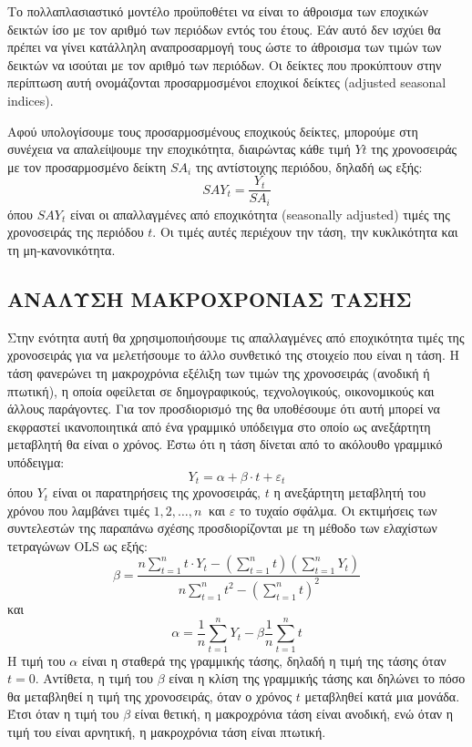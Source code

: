 Το πολλαπλασιαστικό μοντέλο προϋποθέτει να είναι το άθροισμα των εποχικών
δεικτών ίσο με τον αριθμό των περιόδων εντός του έτους. Εάν αυτό δεν ισχύει θα
πρέπει να γίνει κατάλληλη αναπροσαρμογή τους ώστε το άθροισμα των τιμών των
δεικτών να ισούται με τον αριθμό των περιόδων. Οι δείκτες που προκύπτουν στην
περίπτωση αυτή ονομάζονται προσαρμοσμένοι εποχικοί δείκτες (adjusted seasonal
indices).

Αφού υπολογίσουμε τους προσαρμοσμένους εποχικούς δείκτες, μπορούμε στη
συνέχεια να απαλείψουμε την εποχικότητα, διαιρώντας κάθε τιμή $Y t$ της χρονοσειράς
με τον προσαρμοσμένο δείκτη $SA_i$ της αντίστοιχης περιόδου, δηλαδή ως εξής:\\
$$ SAY_t=\frac{Y_t}{SA_i} $$
όπου $SAY_t$ είναι οι απαλλαγμένες από εποχικότητα (seasonally adjusted) τιμές της
χρονοσειράς της περιόδου $t$. Οι τιμές αυτές περιέχουν την τάση, την κυκλικότητα και
τη μη-κανονικότητα.
\subsection{ΑΝΑΛΥΣΗ ΜΑΚΡΟΧΡΟΝΙΑΣ ΤΑΣΗΣ}
Στην ενότητα αυτή θα χρησιμοποιήσουμε τις απαλλαγμένες από εποχικότητα
τιμές της χρονοσειράς για να μελετήσουμε το άλλο συνθετικό της στοιχείο που είναι
η τάση. Η τάση φανερώνει τη μακροχρόνια εξέλιξη των τιμών της χρονοσειράς
(ανοδική ή πτωτική), η οποία οφείλεται σε δημογραφικούς, τεχνολογικούς,
οικονομικούς και άλλους παράγοντες. Για τον προσδιορισμό της θα υποθέσουμε ότι
αυτή μπορεί να εκφραστεί ικανοποιητικά από ένα γραμμικό υπόδειγμα στο οποίο ως
ανεξάρτητη μεταβλητή θα είναι ο χρόνος. Έστω ότι η τάση δίνεται από το ακόλουθο
γραμμικό υπόδειγμα:\\
\begin{equation}
\label{palin}
Y_t=\alpha +\beta \cdot t + \varepsilon_t
\end{equation}
όπου $Y_t$ είναι οι παρατηρήσεις της χρονοσειράς, $t$ η ανεξάρτητη μεταβλητή του
χρόνου που λαμβάνει τιμές $1, 2,\ldots,n\:$ και $\varepsilon$ το τυχαίο σφάλμα. Οι εκτιμήσεις των
συντελεστών της παραπάνω σχέσης προσδιορίζονται με τη μέθοδο των ελαχίστων
τετραγώνων OLS ως εξής:\\
$$ \beta= \frac{n\sum_{t=1}^n t \cdot Y_t -\left(\sum_{t=1}^n t \right) \left( \sum_{t=1}^n Y_t \right)}{n \sum_{t=1}^n t^2 -\left( \sum_{t=1}^n t \right)^2} $$
και\\
$$ \alpha=\frac{1}{n} \sum_{t=1}^n Y_t -\beta \frac{1}{n} \sum_{t=1}^n t $$
Η τιμή του $\alpha $ είναι η σταθερά της γραμμικής τάσης, δηλαδή η τιμή της τάσης όταν
$t=0$. Αντίθετα, η τιμή του $\beta $ είναι η κλίση της γραμμικής τάσης και δηλώνει το πόσο
θα μεταβληθεί η τιμή της χρονοσειράς, όταν ο χρόνος $t$ μεταβληθεί κατά μια μονάδα.
Έτσι όταν η τιμή του $\beta $ είναι θετική, η μακροχρόνια τάση είναι ανοδική, ενώ όταν η
τιμή του είναι αρνητική, η μακροχρόνια τάση είναι πτωτική.

